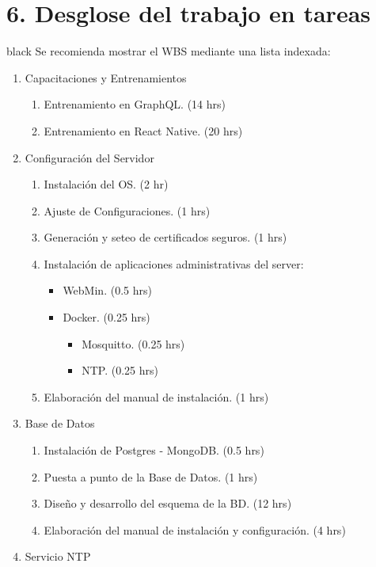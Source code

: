 \documentclass[11pt]{charter}
\begin{document}
\section{6. Desglose del trabajo en tareas}
\label{sec:wbs}

\begin{consigna}{black}
Se recomienda mostrar el WBS mediante una lista indexada:

\begin{enumerate}
\item Capacitaciones y Entrenamientos
	\begin{enumerate}
		\item Entrenamiento en GraphQL. (14 hrs)
		\item Entrenamiento en React Native. (20 hrs)
	\end{enumerate}
\item Configuración del Servidor
	\begin{enumerate}
		\item Instalación del OS. (2 hr)
		\item Ajuste de Configuraciones. (1 hrs)
		\item Generación y seteo de certificados seguros. (1 hrs)
		\item Instalación de aplicaciones administrativas del server:
		\begin{itemize}
			\item WebMin. (0.5 hrs)
			\item Docker. (0.25 hrs)
			\begin{itemize}
				\item Mosquitto. (0.25 hrs) 
				\item NTP. (0.25 hrs)
			\end{itemize}
		\end{itemize}
		\item Elaboración del manual de instalación. (1 hrs)
	\end{enumerate}
\item Base de Datos
	\begin{enumerate}
		\item Instalación de Postgres - MongoDB. (0.5 hrs)
		\item Puesta a punto de la Base de Datos. (1 hrs)
		\item Diseño y desarrollo del esquema de la BD. (12 hrs)
		\item Elaboración del manual de instalación y configuración. (4 hrs)
	\end{enumerate}
\item Servicio NTP 

\end{enumerate}
\end{consigna}
\end{document}
